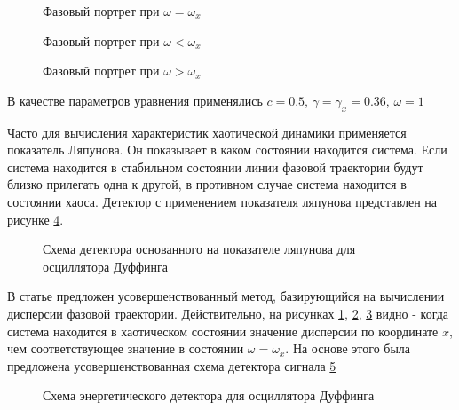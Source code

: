 \begin{figure}[H]
	\center{}
	\caption{Фазовый портрет при ${\omega =\omega_{x}}$}
	\label{pic:duffing_sync}
\end{figure}

\begin{figure}[H]
	\center{}
	\caption{Фазовый портрет при ${\omega < \omega_{x}}$}
	\label{pic:duffing_chaos1}
\end{figure}

\begin{figure}[H]
	\center{}
	\caption{Фазовый портрет при ${\omega > \omega_{x}}$}
	\label{pic:duffing_chaos2}
\end{figure}

В качестве параметров уравнения применялись $c = 0.5$, $\gamma=\gamma_{x}=0.36$, ${\omega=1}$

Часто для вычисления характеристик хаотической динамики применяется показатель Ляпунова.
Он показывает в каком состоянии находится система. Если система находится
в стабильном состоянии линии фазовой траектории будут близко прилегать одна к другой, в противном
случае система находится в состоянии хаоса. Детектор с применением показателя ляпунова
представлен на рисунке \ref{pic:chaos_lyapunov}.

\begin{figure}[H]
	\center{}
	\caption{Схема детектора основанного на показателе ляпунова для осциллятора Дуффинга}
	\label{pic:chaos_lyapunov}
\end{figure}

В статье \cite{chaos_chen} предложен усовершенствованный метод, базирующийся на вычислении дисперсии
фазовой траектории. Действительно, на рисунках \ref{pic:duffing_sync}, \ref{pic:duffing_chaos1},
\ref{pic:duffing_chaos2} видно - когда система находится в хаотическом состоянии значение
дисперсии по координате ${x}$, чем соответствующее значение в состоянии $\omega = \omega_{x}$.
На основе этого была предложена усовершенствованная схема детектора сигнала
\ref{pic:chaos_energy_detector}

\begin{figure}[H]
	\center{}
	\caption{Схема энергетического детектора для осциллятора Дуффинга}
	\label{pic:chaos_energy_detector}
\end{figure}

\newpage
